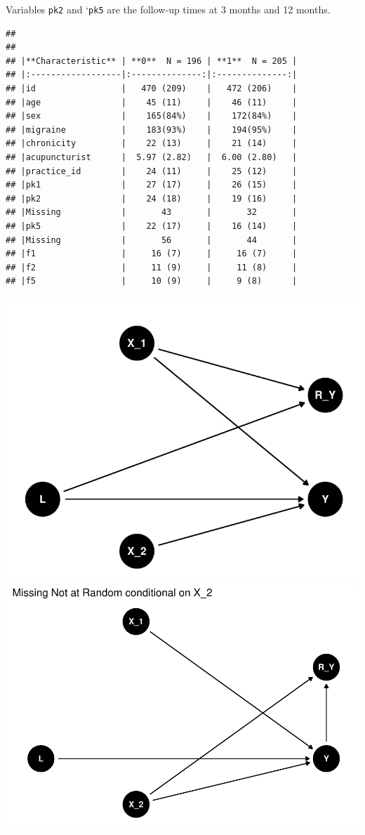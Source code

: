\documentclass{article}
\begin{document}
Variables \texttt{pk2} and `\texttt{pk5} are the follow-up times at 3
months and 12 months.

\begin{verbatim}
## 
## 
## |**Characteristic** | **0**  N = 196 | **1**  N = 205 |
## |:------------------|:--------------:|:--------------:|
## |id                 |   470 (209)    |   472 (206)    |
## |age                |    45 (11)     |    46 (11)     |
## |sex                |    165(84%)    |    172(84%)    |
## |migraine           |    183(93%)    |    194(95%)    |
## |chronicity         |    22 (13)     |    21 (14)     |
## |acupuncturist      |  5.97 (2.82)   |  6.00 (2.80)   |
## |practice_id        |    24 (11)     |    25 (12)     |
## |pk1                |    27 (17)     |    26 (15)     |
## |pk2                |    24 (18)     |    19 (16)     |
## |Missing            |       43       |       32       |
## |pk5                |    22 (17)     |    16 (14)     |
## |Missing            |       56       |       44       |
## |f1                 |     16 (7)     |     16 (7)     |
## |f2                 |     11 (9)     |     11 (8)     |
## |f5                 |     10 (9)     |     9 (8)      |
\end{verbatim}

\includegraphics{Final_Report_files/figure-latex/unnamed-chunk-3-1.pdf}
\includegraphics{Final_Report_files/figure-latex/unnamed-chunk-3-2.pdf}
\end{document}
